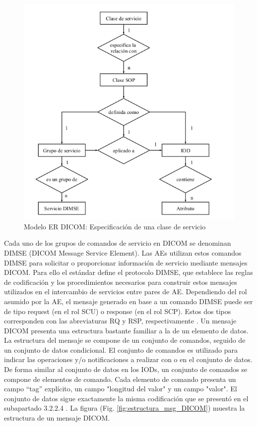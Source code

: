 \begin{figure}[!h]
\begin{center}
\includegraphics[width=1\textwidth]{images/modeloER_DICOM.png}
\caption{Modelo ER DICOM: Especificación de una clase de servicio}
\label{fig:modeloER_DICOM}
\end{center}
\end{figure}

Cada uno de los grupos de comandos de servicio en DICOM se denominan DIMSE (DICOM Message Service Element). Las \acs{AE}s utilizan estos comandos \acs{DIMSE} para solicitar o proporcionar información de servicio mediante mensajes DICOM. Para ello el estándar define el protocolo \acs{DIMSE}, que establece las reglas de codificación y los procedimientos necesarios para construir estos mensajes utilizados en el intercambio de servicios entre pares de \acs{AE}. Dependiendo del rol asumido por la \acs{AE}, el mensaje generado en base a un comando \acs{DIMSE} puede ser de tipo request (en el rol \acs{SCU}) o response (en el rol \acs{SCP}). Estos dos tipos corresponden con las abreviaturas RQ y RSP, respectivamente \cite{11} \cite{16}.
Un mensaje DICOM presenta una estructura bastante familiar a la de un elemento de datos. La estructura del mensaje se compone de un conjunto de comandos, seguido de un conjunto de datos condicional. El conjunto de comandos es utilizado para indicar las operaciones y/o notificaciones a realizar con o en el conjunto de datos. De forma similar al conjunto de datos en los IODs, un conjunto de comandos se compone de elementos de comando. Cada elemento de comando presenta un campo “tag” explícito, un campo "longitud del valor" y un campo "valor". El conjunto de datos sigue exactamente la misma codificación que se presentó en el subapartado 3.2.2.4 . La figura (Fig. \ref{fig:estructura_msg_DICOM})
muestra la estructura de un mensaje DICOM.

